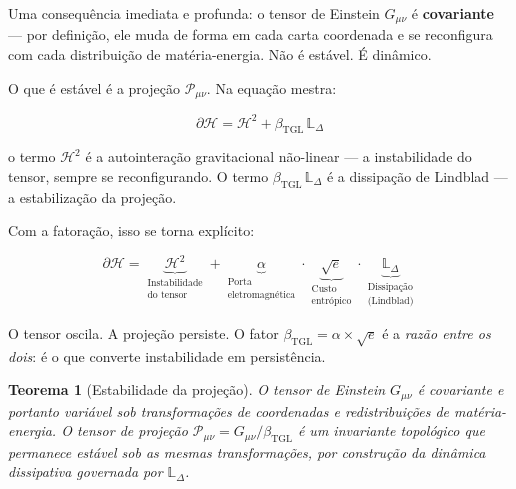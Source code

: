 \documentclass[12pt,a4paper,twoside]{article}
\newtheorem{theorem}{Teorema}[section]
\newcommand{\betatgl}{\beta_{\!\scriptscriptstyle\mathrm{TGL}}}
\begin{document}
Uma consequência imediata e profunda: o tensor de Einstein $G_{\mu\nu}$ é \textbf{covariante} --- por definição, ele muda de forma em cada carta coordenada e se reconfigura com cada distribuição de matéria-energia. Não é estável. É dinâmico.

O que é estável é a projeção $\mathcal{P}_{\mu\nu}$. Na equação mestra:

\begin{equation}
\partial\mathcal{H} = \mathcal{H}^2 + \betatgl\,\mathbb{L}_\Delta
\end{equation}

\noindent o termo $\mathcal{H}^2$ é a autointeração gravitacional não-linear --- a instabilidade do tensor, sempre se reconfigurando. O termo $\betatgl\,\mathbb{L}_\Delta$ é a dissipação de Lindblad --- a estabilização da projeção.

Com a fatoração, isso se torna explícito:

\begin{equation}
\partial\mathcal{H} = \underbrace{\mathcal{H}^2}_{\substack{\text{Instabilidade}\\\text{do tensor}}} + \underbrace{\alpha}_{\substack{\text{Porta}\\\text{eletromagnética}}} \cdot \underbrace{\sqrt{e}}_{\substack{\text{Custo}\\\text{entrópico}}} \cdot \underbrace{\mathbb{L}_\Delta}_{\substack{\text{Dissipação}\\\text{(Lindblad)}}}
\label{eq:mestra_decomposta}
\end{equation}

O tensor oscila. A projeção persiste. O fator $\betatgl = \alpha \times \sqrt{e}$ é a \textit{razão entre os dois}: é o que converte instabilidade em persistência.

\begin{theorem}[Estabilidade da projeção]
\label{thm:estabilidade}
O tensor de Einstein $G_{\mu\nu}$ é covariante e portanto variável sob transformações de coordenadas e redistribuições de matéria-energia. O tensor de projeção $\mathcal{P}_{\mu\nu} = G_{\mu\nu}/\betatgl$ é um invariante topológico que permanece estável sob as mesmas transformações, por construção da dinâmica dissipativa governada por $\mathbb{L}_\Delta$.
\end{theorem}
\end{document}
